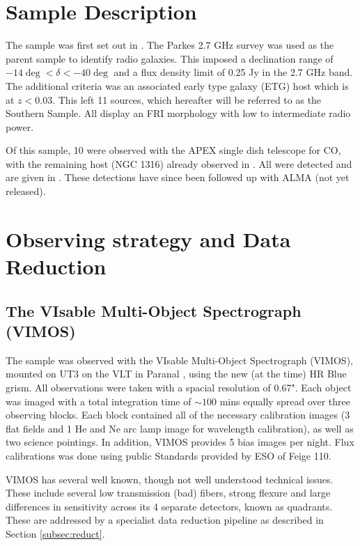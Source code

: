 \documentclass[a4paper,fleqn,usenatbib,useAMS]{mnras}
\begin{document}

\section{Sample Description}
	\label{sec:samp}
	The sample was first set out in \citet{Prandoni2010}. The Parkes 2.7 GHz survey was used as the parent sample to identify radio galaxies. This imposed a declination range of $-14\deg < \delta < -40\deg$ and a flux density limit of 0.25 Jy in the 2.7 GHz band. The additional criteria was an associated early type galaxy (ETG) host which is at $z<0.03$. This left 11 sources, which hereafter will be referred to as the Southern Sample. All display an FRI morphology with low to intermediate radio power.

	Of this sample, 10 were observed with the APEX single dish telescope for CO, with the remaining host (NGC 1316) already observed in \citet{Horellou2001}. All were detected and are given in \citet{Prandoni2010}. These detections have since been followed up with ALMA (not yet released). 


\section{Observing strategy and Data Reduction}
	\label{sec:obs}
	\subsection{The VIsable Multi-Object Spectrograph (VIMOS)}
		\label{subsec:VIMOS}
		The sample was observed with the VIsable Multi-Object Spectrograph (VIMOS), mounted on UT3 on the VLT in Paranal \citep{LeFevre2003}, using the new (at the time) HR Blue grism. All observations were taken with a spacial resolution of 0.67". Each object was imaged with a total integration time of $\sim 100$ mins equally spread over three observing blocks. Each block contained all of the necessary calibration images (3 flat fields and 1 He and Ne arc lamp image for wavelength calibration), as well as two science pointings. In addition, VIMOS provides 5 bias images per night. Flux calibrations was done using public Standards provided by ESO of Feige 110.

		VIMOS has several well known, though not well understood technical issues. These include several low transmission (bad) fibers, strong flexure and large differences in sensitivity across its 4 separate detectors, known as quadrants. These are addressed by a specialist data reduction pipeline as described in Section \ref{subsec:reduct}. 
\end{document}
